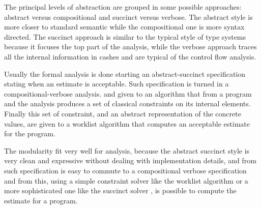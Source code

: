 The principal levels of abstraction are grouped in some possible approaches: abstract versus compositional and succinct versus verbose. The abstract style is more closer to standard semantic while the compositional one is more syntax directed. The succinct approach is similar to the typical style of type systems because it focuses the top part of the analysis, while the verbose approach traces all the internal information in cashes and are typical of the control flow analysis.

Usually the formal analysis is done starting an abstract-succinct specification stating when an estimate is acceptable. Such specification is turned in a compositional-verbose analysis. and given to an algorithm that from a program and the analysis produces a set of classical constraints on its internal elements. Finally this set of constraint, and an abstract representation of the concrete values, are given to a worklist algorithm that computes an acceptable estimate for the program.

The modularity fit very well for analysis, because the abstract succinct style is very clean and expressive without dealing with implementation details, and from such specification is easy to commute to a compositional verbose specification and from this, using a simple constraint solver like the worklist algorithm \cite{PrincipleProgramAnalysis} or a more sophisticated one like the succinct solver \cite{SuccinctSolver}, is possible to compute the estimate for a program. 